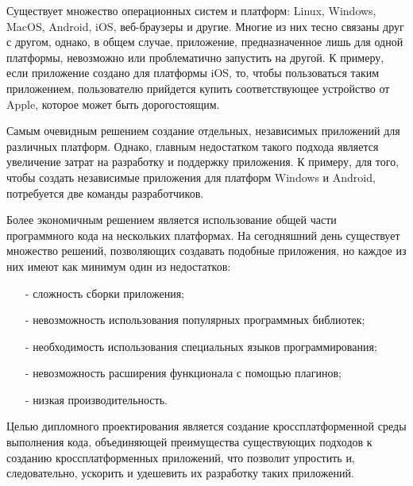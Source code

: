 Существует множество операционных систем и платформ: Linux, Windows, MacOS, Android, iOS, веб-браузеры и другие.
Многие из них тесно связаны друг с другом, однако, в общем случае, приложение, предназначенное лишь для одной платформы, невозможно или проблематично запустить на другой.
К примеру, если приложение создано для платформы iOS, то, чтобы пользоваться таким приложением, пользователю прийдется купить соответствующее устройство от Apple, которое может быть дорогостоящим.

Самым очевидным решением создание отдельных, независимых приложений для различных платформ.
Однако, главным недостатком такого подхода является увеличение затрат на разработку и поддержку приложения. 
К примеру, для того, чтобы создать независимые приложения для платформ Windows и Android, потребуется две команды разработчиков.

Более экономичным решением является использование общей части программного кода на нескольких платформах.
На сегодняшний день существует множество решений, позволяющих создавать подобные приложения, но каждое из них имеют как минимум один из недостатков:
\begin{itemize}
    \item[-] сложность сборки приложения;
    \item[-] невозможность использования популярных программных библиотек;
    \item[-] необходимость использования специальных языков программирования;
    \item[-] невозможность расширения функционала с помощью плагинов;
    \item[-] низкая производительность.
\end{itemize}

Целью дипломного проектирования является создание кроссплатформенной среды выполнения кода, объединяющей преимущества существующих подходов к созданию кроссплатформенных приложений, что позволит упростить и, следовательно, ускорить и удешевить их разработку таких приложений.
